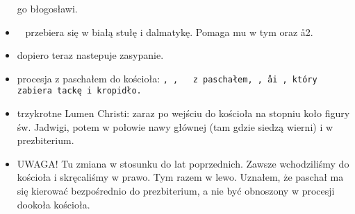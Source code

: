 \begin{itemize}
	      go błogosławi.
	\item \ii~ przebiera się w białą stułę i dalmatykę. Pomaga mu w tym 
	      oraz \aa2.
	\item dopiero teraz nastepuje zasypanie.
	\item procesja z paschałem do kościoła: \tt, , \ii~ z paschałem,
	      \cc, \aa i , który zabiera tackę i kropidło.
	\item trzykrotne Lumen Christi: zaraz po wejściu do kościoła na stopniu koło
	      figury św. Jadwigi, potem w połowie nawy głównej (tam gdzie siedzą
	      wierni) i w prezbiterium.
	\item UWAGA! Tu zmiana w stosunku do lat poprzednich. Zawsze wchodziliśmy do
	      kościoła i skręcaliśmy w prawo. Tym razem w lewo. Uznałem, że paschał
	      ma się kierować bezpośrednio do prezbiterium, a nie być obnoszony w
	      procesji dookoła kościoła.
\end{itemize}

